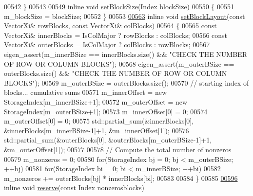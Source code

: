 \begin{DoxyCode}
00542     \}
00543 
\hyperlink{group___sparse_core___module_a1984d81fa41dc2f4e8f1208f602e7e45}{00549}     \textcolor{keyword}{inline} \textcolor{keywordtype}{void} \hyperlink{group___sparse_core___module_a1984d81fa41dc2f4e8f1208f602e7e45}{setBlockSize}(Index blockSize)
00550     \{
00551       m\_blockSize = blockSize;
00552     \}
00553 
\hyperlink{group___sparse_core___module_acad69e4bb5e747db973cacc75c2f4a4d}{00563}     \textcolor{keyword}{inline} \textcolor{keywordtype}{void} \hyperlink{group___sparse_core___module_acad69e4bb5e747db973cacc75c2f4a4d}{setBlockLayout}(\textcolor{keyword}{const} VectorXi& rowBlocks, \textcolor{keyword}{const} VectorXi& colBlocks)
00564     \{
00565       \textcolor{keyword}{const} VectorXi& innerBlocks = IsColMajor ? rowBlocks : colBlocks;
00566       \textcolor{keyword}{const} VectorXi& outerBlocks = IsColMajor ? colBlocks : rowBlocks;
00567       eigen\_assert(m\_innerBSize == innerBlocks.size() && \textcolor{stringliteral}{"CHECK THE NUMBER OF ROW OR COLUMN BLOCKS"});
00568       eigen\_assert(m\_outerBSize == outerBlocks.size() && \textcolor{stringliteral}{"CHECK THE NUMBER OF ROW OR COLUMN BLOCKS"});
00569       m\_outerBSize = outerBlocks.size();
00570       \textcolor{comment}{//  starting index of blocks... cumulative sums}
00571       m\_innerOffset = \textcolor{keyword}{new} StorageIndex[m\_innerBSize+1];
00572       m\_outerOffset = \textcolor{keyword}{new} StorageIndex[m\_outerBSize+1];
00573       m\_innerOffset[0] = 0;
00574       m\_outerOffset[0] = 0;
00575       std::partial\_sum(&innerBlocks[0], &innerBlocks[m\_innerBSize-1]+1, &m\_innerOffset[1]);
00576       std::partial\_sum(&outerBlocks[0], &outerBlocks[m\_outerBSize-1]+1, &m\_outerOffset[1]);
00577 
00578       \textcolor{comment}{// Compute the total number of nonzeros}
00579       m\_nonzeros = 0;
00580       \textcolor{keywordflow}{for}(StorageIndex bj = 0; bj < m\_outerBSize; ++bj)
00581         \textcolor{keywordflow}{for}(StorageIndex bi = 0; bi < m\_innerBSize; ++bi)
00582           m\_nonzeros += outerBlocks[bj] * innerBlocks[bi];
00583 
00584     \}
00585 
\hyperlink{group___sparse_core___module_a2e1814d2fb4d66320ce3ec97303d0648}{00596}     \textcolor{keyword}{inline} \textcolor{keywordtype}{void} \hyperlink{group___sparse_core___module_a2e1814d2fb4d66320ce3ec97303d0648}{reserve}(\textcolor{keyword}{const} Index nonzerosblocks)

\end{DoxyCode}
